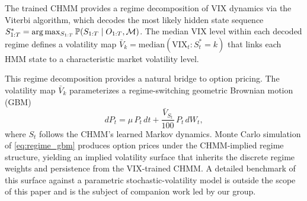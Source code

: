 The trained CHMM provides a regime decomposition of VIX dynamics via the Viterbi algorithm, which decodes the most likely hidden state sequence $S_{1:T}^{*} = \arg\max_{S_{1:T}} \mathbb{P}(S_{1:T} \mid O_{1:T}, \mathcal{M})$.
The median VIX level within each decoded regime defines a volatility map $\bar{V}_k = \text{median}(\text{VIX}_t : S_t^* = k)$ that links each HMM state to a characteristic market volatility level.

This regime decomposition provides a natural bridge to option pricing.
The volatility map $\bar{V}_k$ parameterizes a regime-switching geometric Brownian motion (GBM)
\begin{equation}
    dP_t = \mu\, P_t\, dt + \frac{\bar{V}_{S_t}}{100}\, P_t\, dW_t,
    \label{eq:regime_gbm}
\end{equation}
where $S_t$ follows the CHMM's learned Markov dynamics.
Monte Carlo simulation of \eqref{eq:regime_gbm} produces option prices under the CHMM-implied regime structure, yielding an implied volatility surface that inherits the discrete regime weights and persistence from the VIX-trained CHMM.
A detailed benchmark of this surface against a parametric stochastic-volatility model is outside the scope of this paper and is the subject of companion work led by our group.
